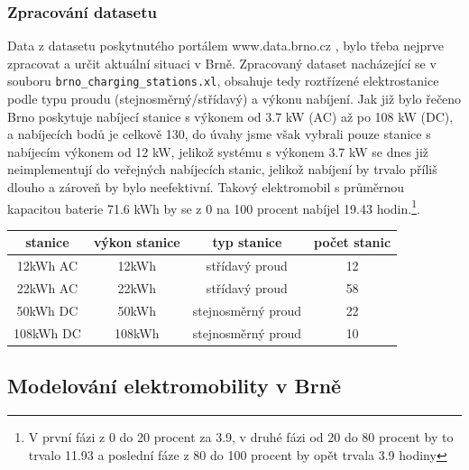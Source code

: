 \documentclass[a4paper,11pt]{article}
\begin{document}
\subsubsection{Zpracování datasetu}
Data z datasetu poskytnutého portálem www.data.brno.cz \cite{data_brno}, bylo třeba nejprve zpracovat a určit 
aktuální situaci v Brně. Zpracovaný dataset nacházející se v souboru \texttt{brno\_charging\_stations.xl},
obsahuje tedy roztřízené elektrostanice podle typu proudu (stejnosměrný/střídavý) a výkonu nabíjení. Jak již bylo
řečeno Brno poskytuje nabíjecí stanice s výkonem od 3.7 kW (AC) až po 108 kW (DC), a nabíjecích bodů je celkově 130,
do úvahy jsme však vybrali pouze stanice s nabíjecím výkonem od 12 kW, jelikož systému s výkonem 3.7 kW se dnes již 
neimplementují do veřejných nabíjecích stanic, jelikož nabíjení by trvalo příliš dlouho a zároveň by bylo neefektivní.
Takový elektromobil s průměrnou kapacitou baterie 71.6 kWh by se z 0 na 100 procent nabíjel 19.43 hodin.\footnote{V první fázi 
z 0 do 20 procent za 3.9, v druhé fázi od 20 do 80 procent by to trvalo 11.93 a poslední fáze z 80 do 100 procent by opět trvala 3.9 hodiny}.

\begin{center}
    \vspace{0.5cm} %
    \begin{tabular}{|c|c|c|c|}
        \hline
        \textbf{stanice} & \textbf{výkon stanice} & \textbf{typ stanice} & \textbf{počet stanic}\\
        \hline
        12kWh  AC &  12kWh   & střídavý proud       & 12  \\
        \hline
        22kWh  AC &  22kWh   & střídavý proud       & 58  \\
        \hline
        50kWh  DC &  50kWh   & stejnosměrný proud   & 22  \\
        \hline
        108kWh DC &  108kWh  & stejnosměrný proud   & 10  \\
        \hline
    \end{tabular}
    \vspace{0.5cm} %
\end{center}

\subsection{Modelování elektromobility v Brně}
\end{document}
